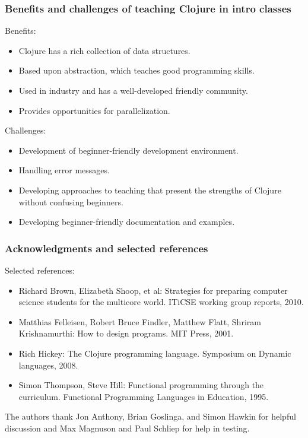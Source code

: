 \documentclass{beamer}
\newcommand{\allcomments}[1]{{#1}}
\newcommand{\joecomment}[1]{{\bf \color{JoesGold}{\allcomments{{#1}}}}}
\begin{document}
\begin{frame}
\frametitle{Benefits and challenges of teaching Clojure in intro classes}
Benefits:
\begin{itemize}
\item Clojure has a rich collection of data structures.
\item Based upon abstraction, which teaches good programming skills. 
\item Used in industry and has a well-developed friendly community. 
\item Provides opportunities for parallelization. 
\end{itemize}
Challenges:
\begin{itemize}
\item Development of beginner-friendly development environment. 
\item Handling error messages.
\item Developing approaches to teaching that present the strengths of Clojure without confusing beginners. 
\item Developing beginner-friendly documentation and examples. 
\end{itemize}%
\end{frame}

\begin{frame}
\frametitle{Acknowledgments and selected references}
Selected references:
\begin{itemize}
\item Richard Brown, Elizabeth Shoop, et al: Strategies for preparing computer science students for the multicore world.  ITiCSE working group reports, 2010.
\item Matthias Felleisen, Robert Bruce Findler, Matthew Flatt, Shriram Krishnamurthi: How to design
programs. MIT Press, 2001.
\item Rich Hickey: The Clojure programming language. Symposium on
Dynamic languages, 2008. 
\item Simon Thompson, Steve Hill: Functional programming through the curriculum. Functional
Programming Languages in Education, 1995. 
\end{itemize}
The authors thank Jon Anthony, Brian Goslinga, and Simon Hawkin for helpful discussion and Max Magnuson and Paul Schliep for help in testing. 
\end{frame}
\end{document}

